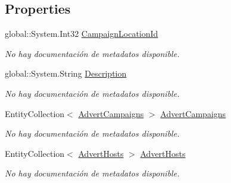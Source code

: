 \subsection*{Properties}
\begin{DoxyCompactItemize}
\item 
global\-::\-System.\-Int32 \hyperlink{class_microsoft_1_1_samples_1_1_kinect_1_1_basic_interactions_1_1_campaign_locations_a7310824ef80471421777bc6e0fa0ff9e}{Campaign\-Location\-Id}
\begin{DoxyCompactList}\small\item\em No hay documentación de metadatos disponible. \end{DoxyCompactList}\item 
global\-::\-System.\-String \hyperlink{class_microsoft_1_1_samples_1_1_kinect_1_1_basic_interactions_1_1_campaign_locations_abf89910022121ce59a1c01c11bd0611b}{Description}
\begin{DoxyCompactList}\small\item\em No hay documentación de metadatos disponible. \end{DoxyCompactList}\item 
Entity\-Collection$<$ \hyperlink{class_microsoft_1_1_samples_1_1_kinect_1_1_basic_interactions_1_1_advert_campaigns}{Advert\-Campaigns} $>$ \hyperlink{class_microsoft_1_1_samples_1_1_kinect_1_1_basic_interactions_1_1_campaign_locations_aa5f3e18a0212b8f78e3b0ffeb87837a2}{Advert\-Campaigns}
\begin{DoxyCompactList}\small\item\em No hay documentación de metadatos disponible. \end{DoxyCompactList}\item 
Entity\-Collection$<$ \hyperlink{class_microsoft_1_1_samples_1_1_kinect_1_1_basic_interactions_1_1_advert_hosts}{Advert\-Hosts} $>$ \hyperlink{class_microsoft_1_1_samples_1_1_kinect_1_1_basic_interactions_1_1_campaign_locations_a3c46c1ccd6c6249738bb1cd2500d443d}{Advert\-Hosts}
\begin{DoxyCompactList}\small\item\em No hay documentación de metadatos disponible. \end{DoxyCompactList}\end{DoxyCompactItemize}


